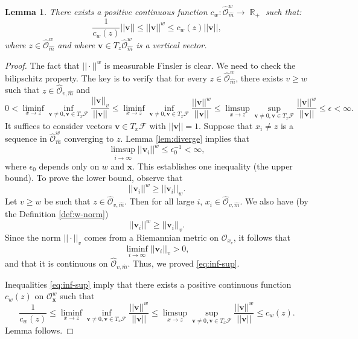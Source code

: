 \documentclass[12pt]{amsbook}%
\newtheorem{lem}[thm]{Lemma}
\theoremstyle{definition}
\theoremstyle{remark}
\numberwithin{section}{chapter}
\numberwithin{subsection}{section}
\numberwithin{figure}{chapter}
\DeclareMathOperator{\Opp}{Opp}
\DeclareMathOperator{\R}{\mathbb{R}}
\def\cF{{\mathscr{F}}}
\def\cO{{\mathscr{O}}}
\def\bv{\mathbf{v}}
\def\bx{\mathbf{x}}
\begin{document}
{{\begin{lem}
There exists a positive continuous function $c_w: \hat{\cO}_{\hat{m}}^w\to \R_+$  such that:
 $$
\frac{1}{c_w(z)}||\bv|| \leqslant ||\bv||^w\leqslant c_w(z)||\bv||, 
$$
where  $z\in \hat{\cO}_{\hat{m}}^w$ and where $\bv\in T_z\hat{\cO}_{\hat{m}}^w$ is a vertical vector.  
\end{lem}
\begin{proof} The fact that $||\cdot||^w$ is measurable Finsler is clear. We need to check the bilipschitz property. The key is to verify that for every 
$z\in \hat{\cO}_{\hat{m}}^w$, there exists $v \geqslant w$ such that $z \in \hat{\cO}_{v,\hat{m}}$ and 
\begin{equation}\label{eq:inf-sup} 
0<\liminf_{x\to z} \inf_{\bv\ne 0, \bv\in T_x \cF} \dfrac{||\bv||_v}{|| \bv||} \leqslant \liminf_{x\to z} \inf_{\bv\ne 0, \bv\in T_x \cF} \frac{||\bv||^w}{||\bv||}\leqslant \limsup_{x\to z} \sup_{\bv\ne 0, \bv\in T_x \cF} \frac{||\bv||^w}{||\bv||} \leqslant \epsilon <\infty. 
\end{equation}
It suffices to consider vectors $\bv\in T_x \cF$ with $||\bv||=1$. Suppose that $x_i\ne z$ is a sequence in $\hat{\cO}^w_{\hat{m}}$ 
converging to  $z$.  Lemma \ref{lem:diverge} implies that
$$
\limsup_{i\to\infty}  ||\bv_i||^w \leqslant  \epsilon_0^{-1} <\infty, 
$$
where $\epsilon_0$ depends only on $w$ and $\bx$. 
This establishes one inequality (the upper bound). To prove the lower bound, observe that 
$$
||\bv_i||^w \geqslant ||\bv_i||_w. 
$$ 
Let $v\ge w$ be such that $z\in \hat{\cO}_{v, \hat{m}}$. Then for all large $i$, $x_i\in \hat{\cO}_{v, \hat{m}}$. We also have (by the Definition \ref{def:w-norm}) 
$$
||\bv_i||^w \geqslant ||\bv_i||_v. 
$$
Since the norm $||\cdot||_v$ comes from a Riemannian metric on $\cO_{x_v}$, it follows that 
$$
\liminf_{i\to\infty}  ||\bv_i||_v>0,$$
and that it is continuous on $\hat{\cO}_{v,\hat{m}}$. 
Thus, we proved \eqref{eq:inf-sup}. 

Inequalities \eqref{eq:inf-sup} imply that there exists a positive continuous function $c_w(z)$ on $\cO_{\bx}^w$ 
such that  
$$
\frac{1}{c_w(z)}\leqslant \liminf_{x\to z} \inf_{\bv\ne 0, \bv\in T_x \cF} \frac{||\bv||^w}{||\bv||} \leqslant 
\limsup_{x\to z} \sup_{\bv\ne 0, \bv\in T_x \cF} \frac{||\bv||^w}{||\bv||} \leqslant 
c_w(z).  
$$
Lemma follows. 
 \end{proof} 

}}
\end{document}
